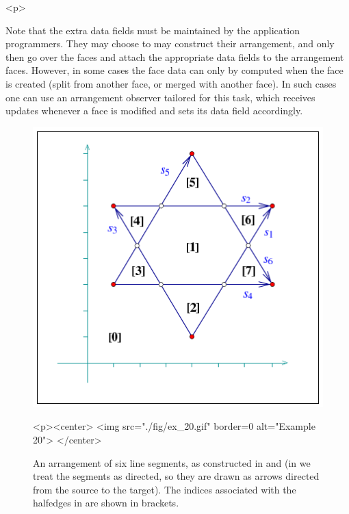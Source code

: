 \begin{ccHtmlOnly}<p>\end{ccHtmlOnly}
Note that the extra data fields must be maintained by the application
programmers. They may choose to may construct their arrangement, and
only then go over the faces and attach the appropriate data fields to
the arrangement faces. However, in some cases the face data can only
by computed when the face is created (split from another face, or merged
with another face). In such cases one can use an arrangement observer
tailored for this task, which receives updates whenever a face is
modified and sets its data field accordingly. 

\begin{figure}[!htp]
\begin{ccTexOnly}
  \begin{center}
  \includegraphics{Arrangement_2/fig/ex_20}
  \end{center}
\end{ccTexOnly}
\begin{ccHtmlOnly}
  <p><center>
  <img src="./fig/ex_20.gif" border=0 alt="Example 20">
  </center>
\end{ccHtmlOnly}
\caption{An arrangement of six line segments, as constructed in
 and  (in  we treat
the segments as directed, so they are drawn as arrows directed from the
source to the target). The indices associated with the halfedges in
 are shown in brackets.}
\label{arr_fig:ex_20}
\end{figure}

